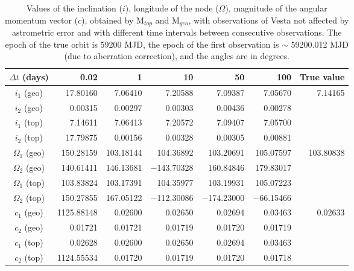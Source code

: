 \documentclass[11pt]{article}
\begin{document}
\begin{table}[h!]
    \small
    \begin{center}
    \begin{tabular}{c|r|r|r|r|r|r}
        ${\Delta t}$ (days) &0.02 &1 &10 &50 &100 & True value\\
        \hline
        $i_1$ (geo) &17.80160   &7.06410   &7.20588   &7.09387   &7.05670   &\multirow{4}{*}{7.14165}\\
        $i_2$ (geo) &0.00315    &0.00297   &0.00303   &0.00436   &0.00278   &\\
        $i_1$ (top) &7.14611    &7.06413   &7.20572   &7.09407   &7.05700   &\\
        $i_2$ (top) &17.79875   &0.00156   &0.00328   &0.00305   &0.00881   &\\
        \hline
        $\Omega_1$ (geo) &150.28159   &103.18144   &104.36892      &103.20691   &   105.07597 & \multirow{4}{*}{103.80838}\\
        $\Omega_2$ (geo) &140.61411   &146.13681   &$-$143.70328   &160.84846   &   179.83017 & \\
        $\Omega_1$ (top) &103.83824   &103.17391   &104.35977      &103.19931   &   105.07223 & \\
        $\Omega_2$ (top) &150.27855   &167.05122   &$-$112.30086   &$-$174.23000   &$-$66.15466 & \\
        \hline
        $c_1$ (geo) &1125.88148   &0.02600   &0.02650   &0.02694   &0.03463   & \multirow{4}{*}{0.02633}\\
        $c_2$ (geo) & 0.01721     &0.01721   &0.01719   &0.01720   &0.01719   & \\
        $c_1$ (top) & 0.02628     &0.02600   &0.02650   &0.02694   &0.03463   & \\
        $c_2$ (top) &1124.55534   &0.01720   &0.01719   &0.01720   &0.01718   & \\
        \hline
    \end{tabular}
    \end{center}
    \caption{Values of the inclination ($i$), longitude of the node ($\Omega$), magnitude of the angular momentum vector ($c$), obtained by M$_{top}$ and M$_{geo}$, with observations of Vesta not affected by astrometric error and with different time intervals between consecutive observations. 
    The epoch of the true orbit is 59200 MJD, the epoch of the first observation is $\sim$ 59200.012 MJD (due to aberration correction), and the angles are in degrees.}
    \label{tab:geo_noerr}
\end{table}
\normalsize
\end{document}
